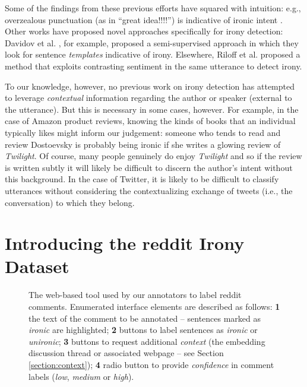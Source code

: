 \documentclass[11pt]{article}
\begin{document}
Some of the findings from these previous efforts have squared with intuition: e.g., overzealous punctuation (as in ``great idea!!!!'') is indicative of ironic intent \cite{carvalho_09}. Other works have proposed novel approaches specifically for irony detection: Davidov et al. , for example, proposed a semi-supervised approach in which they look for sentence \emph{templates} indicative of irony. Elsewhere, Riloff et al.  proposed a method that exploits contrasting sentiment in the same utterance to detect irony. 

To our knowledge, however, no previous work on irony detection has attempted to leverage \emph{contextual} information regarding the author or speaker (external to the utterance). But this is necessary in some cases, however. For example, in the case of Amazon product reviews, knowing the kinds of books that an individual typically likes might inform our judgement: someone who tends to read and review Dostoevsky is probably being ironic if she writes a glowing review of \emph{Twilight}. Of course, many people genuinely do enjoy \emph{Twilight} and so if the review is written subtly it will likely be difficult to discern the author's intent without this background. In the case of Twitter, it is likely to be difficult to classify utterances without considering the contextualizing exchange of tweets (i.e., the conversation) to which they belong.

\section{Introducing the reddit Irony Dataset}
\label{section:reddit-data}

\begin{figure}
	\centering
	\caption{The web-based tool used by our annotators to label reddit comments. Enumerated interface elements are described as follows: {\bf 1} the text of the comment to be annotated -- sentences marked as \emph{ironic} are highlighted; {\bf 2} buttons to label sentences as \emph{ironic} or \emph{unironic}; {\bf 3} buttons to request additional \emph{context} (the embedding discussion thread or associated webpage -- see Section \ref{section:context}); {\bf 4} radio button to provide \emph{confidence} in comment labels (\emph{low}, \emph{medium} or \emph{high}).}
	\label{figure:screenshot}
	\vspace{-1 em}
\end{figure}
\end{document}
